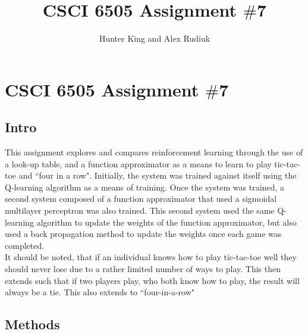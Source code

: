\documentclass[12pt,a4paper]{article}
\author{Hunter King and Alex Rudiuk}
\title{CSCI 6505 Assignment $\#$7}
\begin{document}
\section*{CSCI 6505 Assignment $\#$7}
\subsection*{Intro}
This assignment explores and compares reinforcement learning through the use of a look-up table, and a function approximator as a means to learn to play tic-tac-toe and ``four in a row". Initially, the system was trained against itself using the Q-learning algorithm as a means of training. Once the system was trained, a second system composed of a function approximator that used a sigmoidal multilayer perceptron was also trained. This second system used the same Q-learning algorithm to update the weights of the function approximator, but also used a back propagation method to update the weights once each game was completed.\\
It should be noted, that if an individual knows how to play tic-tac-toe well they should never lose due to a rather limited number of ways to play. This then extends such that if two players play, who both know how to play, the result will always be a tie. This also extends to ``four-in-a-row"
\subsection*{Methods}
\end{document}
